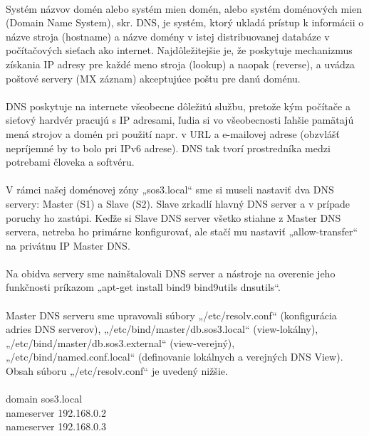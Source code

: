 \paragraph{}
Systém názvov domén alebo systém mien domén, alebo systém doménových mien (Domain Name System), skr. DNS, je systém, ktorý ukladá prístup k informácii o názve stroja (hostname) a názve domény v istej distribuovanej databáze v počítačových sieťach ako internet. Najdôležitejšie je, že poskytuje mechanizmus získania IP adresy pre každé meno stroja (lookup) a naopak (reverse), a uvádza poštové servery (MX záznam) akceptujúce poštu pre danú doménu.
\paragraph{}
DNS poskytuje na internete všeobecne dôležitú službu, pretože kým počítače a sieťový hardvér pracujú s IP adresami, ľudia si vo všeobecnosti ľahšie pamätajú mená strojov a domén pri použití napr. v URL a e-mailovej adrese (obzvlášť nepríjemné by to bolo pri IPv6 adrese). DNS tak tvorí prostredníka medzi potrebami človeka a softvéru.
\paragraph{}
V rámci našej doménovej zóny „sos3.local“ sme si museli nastaviť dva DNS servery: Master (S1) a Slave (S2). Slave zrkadlí hlavný DNS server a v prípade poruchy ho zastúpi. Keďže si Slave DNS server všetko stiahne z Master DNS servera, netreba ho primárne konfigurovať, ale stačí mu  nastaviť „allow-transfer“ na privátnu IP Master DNS.
\paragraph{}
Na obidva servery sme nainštalovali DNS server a nástroje na overenie jeho funkčnosti príkazom „apt-get install bind9 bind9utils dnsutils“.
\paragraph{}
Master DNS serveru sme upravovali súbory „/etc/resolv.conf“ (konfigurácia adries DNS serverov), „/etc/bind/master/db.sos3.local“ (view-lokálny), „/etc/bind/master/db.sos3.external“ (view-verejný), „/etc/bind/named.conf.local“ (definovanie lokálnych a verejných DNS View). Obsah súboru „/etc/resolv.conf“ je uvedený nižšie.
\\
\\
domain sos3.local\\
nameserver 192.168.0.2\\
nameserver 192.168.0.3\\
\\
\\
